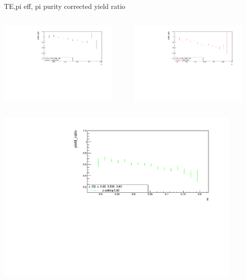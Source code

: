 \begin{frame}{TE,pi eff, pi purity corrected yield ratio}
\begin{columns}
\begin{column}[T]{0.5\textwidth}
\includegraphics[width = 0.9\textwidth]{results/yield/statistics_corr/x_Q2_z_0.65_5.500_0.40_ratio.pdf}
\end{column}
\begin{column}[T]{0.5\textwidth}
\includegraphics[width = 0.9\textwidth]{results/yield/statistics_corr/x_Q2_z_0.65_5.500_0.50_ratio.pdf}
\end{column}
\end{columns}
\begin{columns}
\begin{column}[T]{0.5\textwidth}
\includegraphics[width = 0.9\textwidth]{results/yield/statistics_corr/x_Q2_z_0.65_5.500_0.60_ratio.pdf}

\end{column}
\end{columns}
\end{frame}
